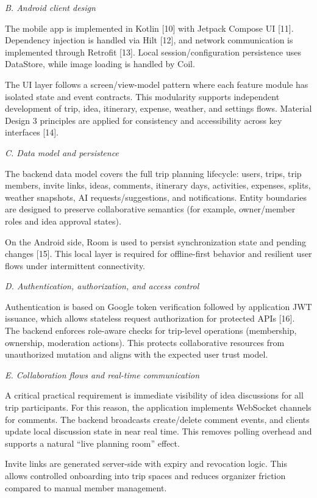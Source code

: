 \documentclass[10pt,twocolumn]{article}
\begin{document}
\textit{B. Android client design}

The mobile app is implemented in Kotlin [10] with Jetpack Compose UI [11]. Dependency injection is handled via Hilt [12], and network communication is implemented through Retrofit [13]. Local session/configuration persistence uses DataStore, while image loading is handled by Coil.

The UI layer follows a screen/view-model pattern where each feature module has isolated state and event contracts. This modularity supports independent development of trip, idea, itinerary, expense, weather, and settings flows. Material Design 3 principles are applied for consistency and accessibility across key interfaces [14].

\textit{C. Data model and persistence}

The backend data model covers the full trip planning lifecycle: users, trips, trip members, invite links, ideas, comments, itinerary days, activities, expenses, splits, weather snapshots, AI requests/suggestions, and notifications. Entity boundaries are designed to preserve collaborative semantics (for example, owner/member roles and idea approval states).

On the Android side, Room is used to persist synchronization state and pending changes [15]. This local layer is required for offline-first behavior and resilient user flows under intermittent connectivity.

\textit{D. Authentication, authorization, and access control}

Authentication is based on Google token verification followed by application JWT issuance, which allows stateless request authorization for protected APIs [16]. The backend enforces role-aware checks for trip-level operations (membership, ownership, moderation actions). This protects collaborative resources from unauthorized mutation and aligns with the expected user trust model.

\textit{E. Collaboration flows and real-time communication}

A critical practical requirement is immediate visibility of idea discussions for all trip participants. For this reason, the application implements WebSocket channels for comments. The backend broadcasts create/delete comment events, and clients update local discussion state in near real time. This removes polling overhead and supports a natural ``live planning room'' effect.

Invite links are generated server-side with expiry and revocation logic. This allows controlled onboarding into trip spaces and reduces organizer friction compared to manual member management.
\end{document}
